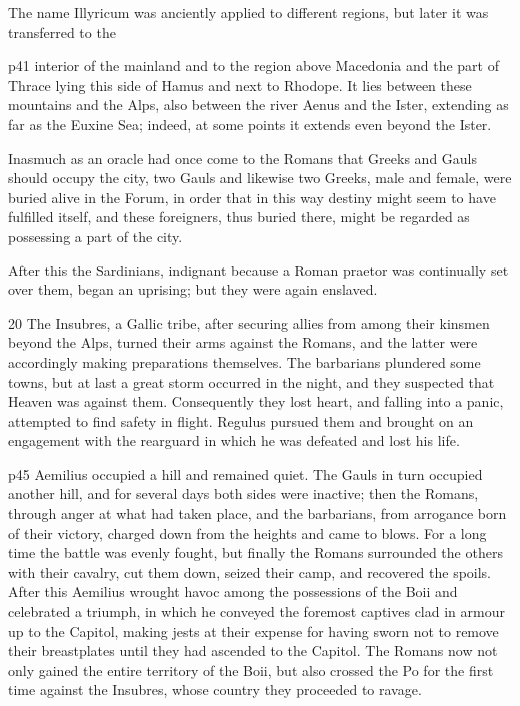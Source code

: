 The name Illyricum was anciently applied to different regions, but later it was transferred to the

p41 interior of the mainland and to the region above Macedonia and the part of Thrace lying this side of Hamus and next to Rhodope. It lies between these mountains and the Alps, also between the river Aenus and the Ister, extending as far as the Euxine Sea; indeed, at some points it extends even beyond the Ister.

Inasmuch as an oracle had once come to the Romans that Greeks and Gauls should occupy the city, two Gauls and likewise two Greeks, male and female, were buried alive in the Forum, in order that in this way destiny might seem to have fulfilled itself, and these foreigners, thus buried there, might be regarded as possessing a part of the city.

After this the Sardinians, indignant because a Roman praetor was continually set over them, began an uprising; but they were again enslaved.

20
The Insubres, a Gallic tribe, after securing allies from among their kinsmen beyond the Alps, turned their arms against the Romans, and the latter were accordingly making preparations themselves. The barbarians plundered some towns, but at last a great storm occurred in the night, and they suspected that Heaven was against them. Consequently they lost heart, and falling into a panic, attempted to find safety in flight. Regulus pursued them and brought on an engagement with the rearguard in which he was defeated and lost his life.

p45 Aemilius occupied a hill and remained quiet. The Gauls in turn occupied another hill, and for several days both sides were inactive; then the Romans, through anger at what had taken place, and the barbarians, from arrogance born of their victory, charged down from the heights and came to blows. For a long time the battle was evenly fought, but finally the Romans surrounded the others with their cavalry, cut them down, seized their camp, and recovered the spoils. After this Aemilius wrought havoc among the possessions of the Boii and celebrated a triumph, in which he conveyed the foremost captives clad in armour up to the Capitol, making jests at their expense for having sworn not to remove their breastplates until they had ascended to the Capitol. The Romans now not only gained the entire territory of the Boii, but also crossed the Po for the first time against the Insubres, whose country they proceeded to ravage.


